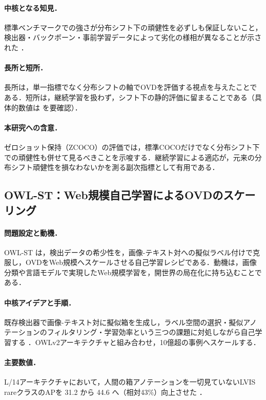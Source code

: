 \paragraph{中核となる知見．}
標準ベンチマークでの強さが分布シフト下の頑健性を必ずしも保証しないこと，検出器・バックボーン・事前学習データによって劣化の様相が異なることが示された \cite{ovdrobust}．

\paragraph{長所と短所．}
長所は，単一指標でなく分布シフトの軸でOVDを評価する視点を与えたことである．短所は，継続学習を扱わず，シフト下の静的評価に留まることである（具体的数値は \cite{ovdrobust} を要確認）．

\paragraph{本研究への含意．}
ゼロショット保持（ZCOCO）の評価では，標準COCOだけでなく分布シフト下での頑健性も併せて見るべきことを示唆する．継続学習による適応が，元来の分布シフト頑健性を損なわないかを測る副次指標として有用である．


\subsection{OWL-ST：Web規模自己学習によるOVDのスケーリング}
\label{subsec:owlst}

\paragraph{問題設定と動機．}
OWL-ST \cite{owlst} は，検出データの希少性を，画像-テキスト対への擬似ラベル付けで克服し，OVDをWeb規模へスケールさせる自己学習レシピである．動機は，画像分類や言語モデルで実現したWeb規模学習を，開世界の局在化に持ち込むことである．

\paragraph{中核アイデアと手順．}
既存検出器で画像-テキスト対に擬似箱を生成し，ラベル空間の選択・擬似アノテーションのフィルタリング・学習効率という三つの課題に対処しながら自己学習する \cite{owlst}．OWLv2アーキテクチャと組み合わせ，10億超の事例へスケールする．

\paragraph{主要数値．}
L/14アーキテクチャにおいて，人間の箱アノテーションを一切見ていないLVIS rareクラスのAPを 31.2 から 44.6 へ（相対43\%）向上させた \cite{owlst}．

